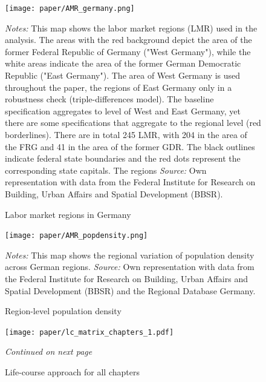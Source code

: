 \documentclass[11pt, a4paper]{article} %
\begin{document}
\begin{figure}[H]\centering
	\caption{Labor market regions in Germany}\label{fig: AMR_regions_Germany}
	\texttt{[image: paper/AMR\_germany.png]}
	\scriptsize
	\begin{minipage}{0.9 \linewidth}
		\emph{Notes:} This map shows the labor market regions (LMR) used in the analysis. The areas with the red background depict the area of the former Federal Republic of Germany ("West Germany"), while the white areas indicate the area of the former German Democratic Republic ("East Germany"). The area of West Germany is used throughout the paper, the regions of East Germany only in a robustness check (triple-differences model). The baseline specification aggregates to level of West and East Germany, yet there are some specifications that aggregate to the regional level (red borderlines). There are in total 245 LMR, with 204 in the area of the FRG and 41 in the area of the former GDR. The black outlines indicate federal state boundaries and the red dots represent the corresponding state capitals. The regions \newline \emph{Source:} Own representation with data from the Federal Institute for Research on Building, Urban Affairs and Spatial Development (BBSR).
	\end{minipage}
\end{figure}
\vspace*{\fill}\clearpage
\newpage

\vspace*{\fill}
\begin{figure}[H]\centering
	\caption{Region-level population density}\label{fig: AMR_regions_population_density}
	\texttt{[image: paper/AMR\_popdensity.png]}
	\scriptsize
	\begin{minipage}{0.9\linewidth}
		\emph{Notes:} This map shows the regional variation of population density across German regions. \newline\emph{Source:} Own representation with data from the Federal Institute for Research on Building, Urban Affairs and Spatial Development (BBSR) and the Regional Database Germany.
	\end{minipage}
\end{figure}
\vspace*{\fill}\clearpage


\begin{figure}[H]\centering
	\caption{Life-course approach for all chapters}\label{fig: appendix_lc_matrix_chapters}
	\texttt{[image: paper/lc\_matrix\_chapters\_1.pdf]}
		\scriptsize
		\begin{minipage}{\linewidth}
			\emph{Continued on next page}
		\end{minipage}
\end{figure}
\end{document}
